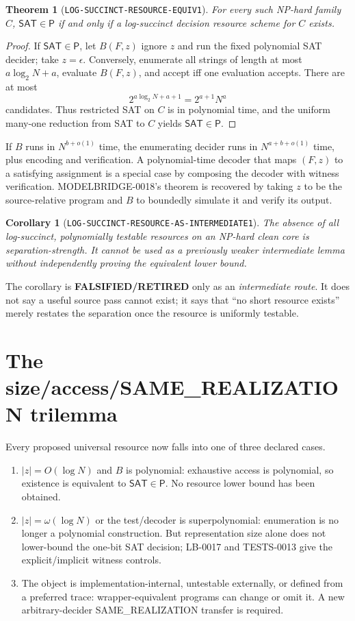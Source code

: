 \documentclass[11pt]{article}
\newtheorem{theorem}{Theorem}
\newtheorem{corollary}{Corollary}
\newcommand{\SAT}{\mathsf{SAT}}
\newcommand{\RETIRED}{\textbf{FALSIFIED/RETIRED}}
\begin{document}
\begin{theorem}[\texttt{LOG-SUCCINCT-RESOURCE-EQUIV1}]
For every such NP-hard family $C$, $\SAT\in\mathsf P$ if and only if a log-succinct decision resource scheme for $C$ exists.
\end{theorem}

\begin{proof}
If $\SAT\in\mathsf P$, let $B(F,z)$ ignore $z$ and run the fixed polynomial SAT decider; take $z=\epsilon$.  Conversely, enumerate all strings of length at most $a\log_2N+a$, evaluate $B(F,z)$, and accept iff one evaluation accepts.  There are at most
\[
2^{a\log_2N+a+1}=2^{a+1}N^a
\]
candidates.  Thus restricted SAT on $C$ is in polynomial time, and the uniform many-one reduction from SAT to $C$ yields $\SAT\in\mathsf P$.
\end{proof}

If $B$ runs in $N^{b+o(1)}$ time, the enumerating decider runs in $N^{a+b+o(1)}$ time, plus encoding and verification.  A polynomial-time decoder that maps $(F,z)$ to a satisfying assignment is a special case by composing the decoder with witness verification.  MODELBRIDGE-0018's theorem is recovered by taking $z$ to be the source-relative program and $B$ to boundedly simulate it and verify its output.

\begin{corollary}[\texttt{LOG-SUCCINCT-RESOURCE-AS-INTERMEDIATE1}]
The absence of all log-succinct, polynomially testable resources on an NP-hard clean core is separation-strength.  It cannot be used as a previously weaker intermediate lemma without independently proving the equivalent lower bound.
\end{corollary}

The corollary is \RETIRED{} only as an \emph{intermediate route}.  It does not say a useful source pass cannot exist; it says that ``no short resource exists'' merely restates the separation once the resource is uniformly testable.

\section{The size/access/SAME\_REALIZATION trilemma}

Every proposed universal resource now falls into one of three declared cases.

\begin{enumerate}[label=\textbf{Case \Alph*.}]
\item $|z|=O(\log N)$ and $B$ is polynomial: exhaustive access is polynomial, so existence is equivalent to $\SAT\in\mathsf P$.  No resource lower bound has been obtained.
\item $|z|=\omega(\log N)$ or the test/decoder is superpolynomial: enumeration is no longer a polynomial construction.  But representation size alone does not lower-bound the one-bit SAT decision; LB-0017 and TESTS-0013 give the explicit/implicit witness controls.
\item The object is implementation-internal, untestable externally, or defined from a preferred trace: wrapper-equivalent programs can change or omit it.  A new arbitrary-decider SAME\_REALIZATION transfer is required.
\end{enumerate}
\end{document}
